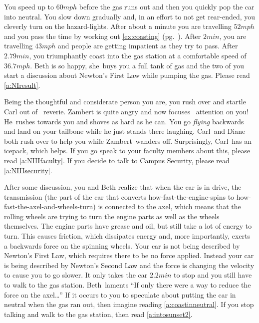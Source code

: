 \documentclass[11pt,letter,openany,makeidx]{book}
\newcounter{storyline}
\renewcommand{\thestoryline}{Storyline \arabic{storyline}}
\newenvironment{Story}{\begin{list}{\textbf{\thestoryline}:}{\usecounter{storyline} \leftmargin 12pt}}{\end{list}}
\newcommand{\studentB}{Beth}        \newcommand{\massB}{\mbox{$75.0\unit{kg}$}}
\newcommand{\studentC}{Carl}        \newcommand{\massC}{\mbox{$90.0\unit{kg}$}}
\newcommand{\studentD}{Diane}       \newcommand{\massD}{\mbox{$80.0\unit{kg}$}}
\newcommand{\studentZ}{Zambert}     \newcommand{\massZ}{\mbox{$95.0\unit{kg}$}}
\newcommand{\HeZ}{He}\newcommand{\HimZ}{Him}\newcommand{\HisZ}{His}
\newcommand{\heB}{she}\newcommand{\himB}{her}\newcommand{\hisB}{her}\newcommand{\himselfB}{herself}
\begin{document}
\begin{Story}
\item\label{a:coastinneutral} You speed up to $60 \unit{mph}$ before the gas runs out and then you quickly pop the car into neutral.  You slow down gradually and, in an effort to not get rear-ended, you cleverly turn on the hazard-lights.  After about a minute you are travelling $52 \unit{mph}$ and you pass the time by working out \autoref{ex:coasting}  (pg.~\pageref{ex:coasting}).  After $2\unit{min}$, you are travelling $43 \unit{mph}$ and people are getting impatient as they try to pass.  After $2.79\unit{min}$, you triumphantly coast into the gas station at a comfortable speed of $36.7\unit{mph}$.  \studentB\index{\studentB} is so happy, \heB\ buys you a full tank of gas and the two of you start a discussion about Newton's First Law while pumping the gas.  Please read \ref{a:NIresult}.
\item\label{a:NIIIconcern} Being the thoughtful and considerate person you are, you rush over and startle \studentC\index{\studentC} out of \hisC\ reverie.  \studentZ\index{\studentZ} is quite angry and now focuses \hisZ\ attention on you!  \HeZ\ rushes towards you and shoves as hard as he can.  You go \textit{flying} backwards and land on your tailbone while he just stands there laughing.  \studentC\ and \studentD\index{\studentD} both rush over to help you while \studentZ\ wanders off.  Surprisingly, \studentC\ has an icepack, which helps.  If you go speak to your faculty members about this, please read \ref{a:NIIIfaculty}. If you decide to talk to Campus Security, please read \ref{a:NIIIsecurity}.
\item\label{a:NIdrive} After some discussion, you and \studentB\index{\studentB} realize that when the car is in drive, the transmission (the part of the car that converts how-fast-the-engine-spins to how-fast-the-axel-and-wheels-turn) is connected to the axel, which means that the rolling wheels are trying to turn the engine parts as well as the wheels themselves.  The engine parts have grease and oil, but still take a lot of energy to turn.  This causes friction, which dissipates energy and, more importantly, exerts a backwards force on the spinning wheels.  Your car is not being described by Newton's First Law, which requires there to be no force applied.  Instead your car is being described by Newton's Second Law and the force is changing the velocity to cause you to go slower.  It only takes the car $2.2\unit{min}$ to stop and you still have to walk to the gas station.  \studentB\ laments ``If only there were a way to reduce the force on the axel\ldots'' If it occurs to you to speculate about putting the car in neutral when the gas ran out, then imagine reading \ref{a:coastinneutral}.  If you stop talking and walk to the gas station, then read \ref{a:intosunset2}.

\end{Story}
\end{document}
